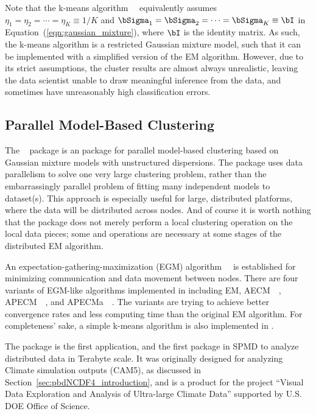 Note that the k-means algorithm~\citep{Forgy1965}~
equivalently assumes
$\eta_1 = \eta_2 = \cdots = \eta_K \equiv 1/K$ and
$\bSigma_1 = \bSigma_2 = \cdots = \bSigma_K \equiv \bI$
in Equation~(\ref{eqn:gaussian_mixture}), where
$\bI$ is the identity matrix.
As such, the k-means algorithm is a restricted Gaussian mixture model, such that
it can be implemented with a simplified version of the EM algorithm.
However, due to its strict assumptions, the cluster results are almost always unrealistic, leaving the data scientist unable to draw meaningful inference from the data, and sometimes have unreasonably high classification errors.


\subsection{Parallel Model-Based Clustering}

The ~\citep{Chen2012pmclustpackage}
package is an 
package for parallel model-based clustering based on Gaussian mixture models
with unstructured dispersions.  The package uses data parallelism to solve one very large clustering problem, rather than the embarrassingly parallel problem of fitting many independent models to dataset(s).  This approach is especially useful for large, distributed platforms, where the data will be distributed across nodes.  And of course it is worth nothing that the package does not merely perform a local clustering operation on the local data pieces; some  and  operations are necessary at some stages of the distributed EM algorithm.

An expectation-gathering-maximization (EGM)
algorithm~\citep{Chen2013}~
is established for minimizing communication and data movement between nodes.
There are four variants of EGM-like algorithms implemented in 
including EM, AECM~\citep{Meng1997}~,
APECM~\citep{Chen2011}~, and
APECMa~\citep{Chen2013}~. The variants are trying to achieve
better convergence rates and less computing time than the original EM algorithm.
For completeness' sake, a simple k-means algorithm is also implemented in .

The  package is the first
 application, and the first
 package in SPMD to analyze distributed data in Terabyte scale.
It was originally designed for analyzing Climate simulation outputs (CAM5),
as discussed in Section~\ref{sec:pbdNCDF4_introduction}, and
is a product for the project
``Visual Data Exploration and Analysis of Ultra-large Climate Data''
supported by U.S. DOE Office of Science.

